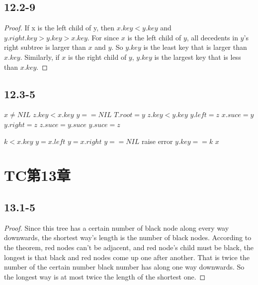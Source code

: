 \documentclass[twocolumn]{article}
\begin{document}
	\subsection*{12.2-9}
	\begin{proof}
		If x is the left child of y, then $x.key<y.key$ and $y.right.key>y.key>x.key$.
		For since $x$ is the left child of $y$, all decedents in $y$'s right subtree is larger than $x$ and $y$. So $y.key$ is the least key that is larger than $x.key$. Similarly, if $x$ is the right child of $y$, $y.key$ is the largest key that is less than $x.key$.
	\end{proof}
	\subsection*{12.3-5}
	\begin{codebox}
		\zi{}\li 
		\If $x\neq NIL$\Then\li 
		\If $z.key<x.key$ \Then\li 
		\li 
		\Else\li 
		\End\End\li 
		\If $y==NIL$\Then\li
		$T.root=y$\li 
		\ElseIf $z.key<y.key$\Then\li 
		$y.left=z$\li 
		$x.suce=y$\li 
		\Else \li 
		$y.right=z$\li 
		$z.suce=y.suce$\li 
		$y.suce=z$\End
	\end{codebox}
	\begin{codebox}
		\zi\proc{Tree-Pred(\id{x}, \id{k})}\li 
		\If $k<x.key$\Then\li 
		$y=x.left$\li 
		\Else \li 
		$y=x.right$\End\li
		\If $y==NIL$\Then\li 
		raise error\li 
		\ElseIf $y.key==k$\Then\li 
		\Return $x$\li 
		\Else\li 
		\Return {}\End  
	\end{codebox}
	\section*{TC第13章}
	\subsection*{13.1-5}
	\begin{proof}
		Since this tree has a certain number of black node along every way downwards, the shortest way's length is the number of black nodes. According to the theorem, red nodes can't be adjacent, and red node's child must be black, the longest is that black and red nodes come up one after another. That is twice the number of the certain number black number has along one way downwards. So the longest way is at most twice the length of the shortest one.
	\end{proof}
\end{document}
